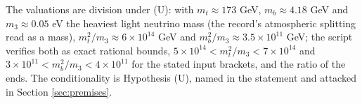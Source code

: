 The valuations are division under (U): with $m_{t} \approx 173$ GeV, $m_{b} \approx 4.18$ GeV and $m_{3} \approx 0.05$ eV the heaviest light neutrino mass (the record's atmospheric splitting read as a mass), $m_{t}^{2}/m_{3} \approx 6 \times 10^{14}$ GeV and $m_{b}^{2}/m_{3} \approx 3.5 \times 10^{11}$ GeV; the script verifies both as exact rational bounds, $5 \times 10^{14} < m_{t}^{2}/m_{3} < 7 \times 10^{14}$ and $3 \times 10^{11} < m_{b}^{2}/m_{3} < 4 \times 10^{11}$ for the stated input brackets, and the ratio of the ends. The conditionality is Hypothesis (U), named in the statement and attacked in Section \ref{sec:premises}.
